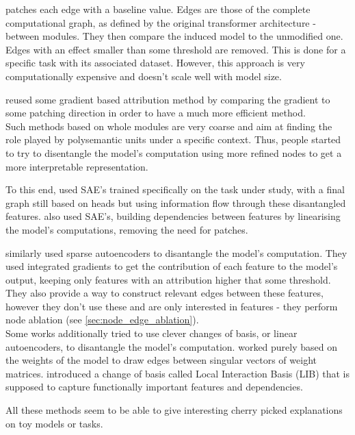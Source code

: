 \documentclass{article}
\begin{document}
\citet{conmy2023automatedACDCCircuits} patches each edge with a baseline value. Edges are those of the complete computational graph, as defined by the original transformer architecture - between modules. They then compare the induced model to the unmodified one. Edges with an effect smaller than some threshold are removed. This is done for a specific task with its associated dataset. However, this approach is very computationally expensive and doesn't scale well with model size.

\citet{syed2023attributionCircuits} reused some gradient based attribution method by comparing the gradient to some patching direction in order to have a much more efficient method.\\

Such methods based on whole modules are very coarse and aim at finding the role played by polysemantic units under a specific context. Thus, people started to try to disentangle the model's computation using more refined nodes to get a more interpretable representation.

To this end, \citet{oneill2024sparse} used SAE's trained specifically on the task under study, with a final graph still based on heads but using information flow through these disantangled features. \citet{he2024dictionaryCircuits} also used SAE's, building dependencies between features by linearising the model's computations, removing the need for patches.%

\citet{marks2024sparseCircuits} similarly used sparse autoencoders to disantangle the model's computation. They used integrated gradients to get the contribution of each feature to the model's output, keeping only features with an attribution higher that some threshold. They also provide a way to construct relevant edges between these features, however they don't use these and are only interested in features - they perform node ablation (see \cref{sec:node_edge_ablation}).\\

Some works additionally tried to use clever changes of basis, or linear autoencoders, to disantangle the model's computation. \citet{merullo2024talking} worked purely based on the weights of the model to draw edges between singular vectors of weight matrices. \citet{bushnaq2024using} introduced a change of basis called Local Interaction Basis (LIB) that is supposed to capture functionally important features and dependencies.

All these methods seem to be able to give interesting cherry picked explanations on toy models or tasks.
\end{document}
